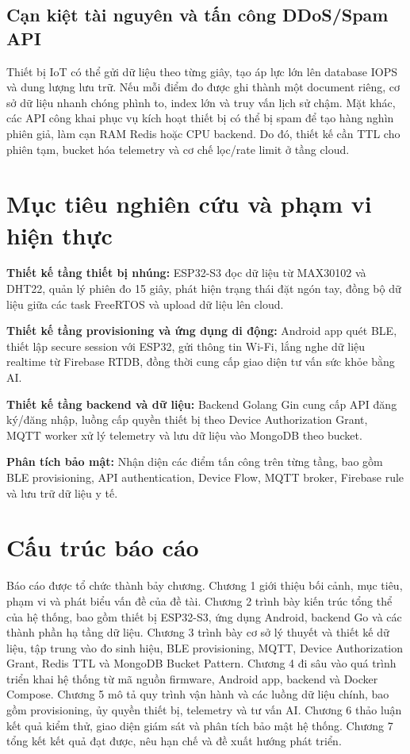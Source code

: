 \documentclass[a4paper,13pt,3p,oneside]{report}
\begin{document}
\subsection{Cạn kiệt tài nguyên và tấn công DDoS/Spam API}
Thiết bị IoT có thể gửi dữ liệu theo từng giây, tạo áp lực lớn lên database IOPS và dung lượng lưu trữ. Nếu mỗi điểm đo được ghi thành một document riêng, cơ sở dữ liệu nhanh chóng phình to, index lớn và truy vấn lịch sử chậm. Mặt khác, các API công khai phục vụ kích hoạt thiết bị có thể bị spam để tạo hàng nghìn phiên giả, làm cạn RAM Redis hoặc CPU backend. Do đó, thiết kế cần TTL cho phiên tạm, bucket hóa telemetry và cơ chế lọc/rate limit ở tầng cloud.
\section{Mục tiêu nghiên cứu và phạm vi hiện thực}
\textbf{Thiết kế tầng thiết bị nhúng:} ESP32-S3 đọc dữ liệu từ MAX30102 và DHT22, quản lý phiên đo 15 giây, phát hiện trạng thái đặt ngón tay, đồng bộ dữ liệu giữa các task FreeRTOS và upload dữ liệu lên cloud.

\textbf{Thiết kế tầng provisioning và ứng dụng di động:} Android app quét BLE, thiết lập secure session với ESP32, gửi thông tin Wi-Fi, lắng nghe dữ liệu realtime từ Firebase RTDB, đồng thời cung cấp giao diện tư vấn sức khỏe bằng AI.

\textbf{Thiết kế tầng backend và dữ liệu:} Backend Golang Gin cung cấp API đăng ký/đăng nhập, luồng cấp quyền thiết bị theo Device Authorization Grant, MQTT worker xử lý telemetry và lưu dữ liệu vào MongoDB theo bucket.

\textbf{Phân tích bảo mật:} Nhận diện các điểm tấn công trên từng tầng, bao gồm BLE provisioning, API authentication, Device Flow, MQTT broker, Firebase rule và lưu trữ dữ liệu y tế.

\section{Cấu trúc báo cáo}
Báo cáo được tổ chức thành bảy chương. Chương 1 giới thiệu bối cảnh, mục tiêu, phạm vi và phát biểu vấn đề của đề tài. Chương 2 trình bày kiến trúc tổng thể của hệ thống, bao gồm thiết bị ESP32-S3, ứng dụng Android, backend Go và các thành phần hạ tầng dữ liệu. Chương 3 trình bày cơ sở lý thuyết và thiết kế dữ liệu, tập trung vào đo sinh hiệu, BLE provisioning, MQTT, Device Authorization Grant, Redis TTL và MongoDB Bucket Pattern. Chương 4 đi sâu vào quá trình triển khai hệ thống từ mã nguồn firmware, Android app, backend và Docker Compose. Chương 5 mô tả quy trình vận hành và các luồng dữ liệu chính, bao gồm provisioning, ủy quyền thiết bị, telemetry và tư vấn AI. Chương 6 thảo luận kết quả kiểm thử, giao diện giám sát và phân tích bảo mật hệ thống. Chương 7 tổng kết kết quả đạt được, nêu hạn chế và đề xuất hướng phát triển.
\end{document}
